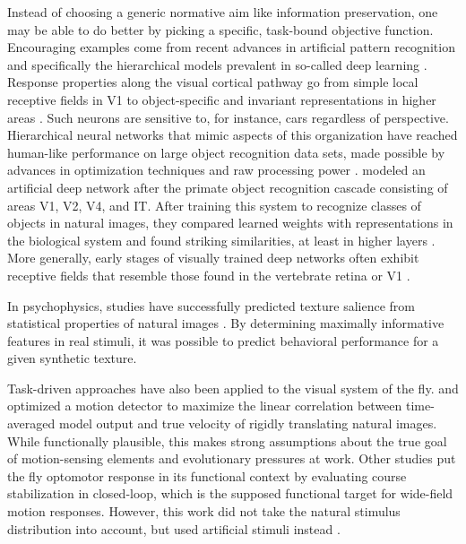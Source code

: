 Instead of choosing a generic normative aim like information preservation, one may be able to do better by picking a specific, task-bound objective function. Encouraging examples come from recent advances in artificial pattern recognition \citep{Bishop:2006aa} and specifically the hierarchical models prevalent in so-called deep learning \citep{Goodfellow:2016aa}. Response properties along the visual cortical pathway go from simple local receptive fields in V1 to object-specific and invariant representations in higher areas \citep{Felleman:1991aa,Yamins:2016hg}. Such neurons are sensitive to, for instance, cars regardless of perspective. Hierarchical neural networks that mimic aspects of this organization \citep{Fukushima:1980ve} have reached human-like performance on large object recognition data sets, made possible by advances in optimization techniques \citep{LeCun:1989aa} and raw processing power \citep{LeCun:2015dt}. \citet{Yamins:2014gi} modeled an artificial deep network after the primate object recognition cascade consisting of areas V1, V2, V4, and IT. After training this system to recognize classes of objects in natural images, they compared learned weights with representations in the biological system and found striking similarities, at least in higher layers \citep{Cadieu:2014in}. More generally, early stages of visually trained deep networks often exhibit receptive fields that resemble those found in the vertebrate retina or V1 \citep{Yamins:2016hg}.

In psychophysics, studies have successfully predicted texture salience from statistical properties of natural images \citep{Tkacik:2010aa,Hermundstad:2014aa}. By determining maximally informative features in real stimuli, it was possible to predict behavioral performance for a given synthetic texture.

Task-driven approaches have also been applied to the visual system of the fly. \citet{Clark:2014aa} and \citet{Fitzgerald:2015aa} optimized a motion detector to maximize the linear correlation between time-averaged model output and true velocity of rigidly translating natural images. While functionally plausible, this makes strong assumptions about the true goal of motion-sensing elements and evolutionary pressures at work. Other studies put the fly optomotor response in its functional context by evaluating course stabilization in closed-loop, which is the supposed functional target for wide-field motion responses. However, this work did not take the natural stimulus distribution into account, but used artificial stimuli instead \citep{Warzecha:1996bm,Warzecha:1998tn}.

